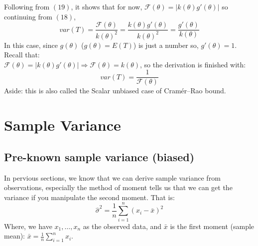 \documentclass[12pt ]{article}
\begin{document}
Following from $(19)$, it shows that for now, $\mathcal{F}(\theta) = |k(\theta)g'(\theta)|$ so continuing from $(18)$,
\begin{equation*}
var(T) = \frac{\mathcal{F}(\theta)}{k(\theta)^2} = \frac{k(\theta)g'(\theta)}{k(\theta)^2} = \frac{g'(\theta)}{k(\theta)}
\end{equation*}
In this case, since $g(\theta)$ ($g(\theta) = E(T)$) is just a number so, $g'(\theta) = 1$. Recall that: \\
$\mathcal{F}(\theta) = |k(\theta)g'(\theta)| \Rightarrow \mathcal{F}(\theta) = k(\theta)$, so the derivation is finished with:
\begin{equation}
var(T) = \frac{1}{\mathcal{F}(\theta)}
\end{equation}
\color{brown}
Aside: this is also called the Scalar unbiased case of Cramér–Rao bound.
\color{black}

\section{Sample Variance}
\subsection{Pre-known sample variance (biased)}
In pervious sections, we know that we can derive sample variance from observations, especially the method of moment tells us that we can get the variance if you manipulate the second moment. That is: \\
\begin{equation*}
\hat{\sigma}^2 = \frac{1}{n} \sum_{i=1}^{n} (x_{i} - \bar{x})^2
\end{equation*}
Where, we have $x_{1}, \ldots, x_{n}$ as the observed data, and $\bar{x}$ is the first moment (sample mean): $\bar{x} = \frac{1}{n} \sum_{i=1}^{n} x_{i}$.\\
\end{document}
